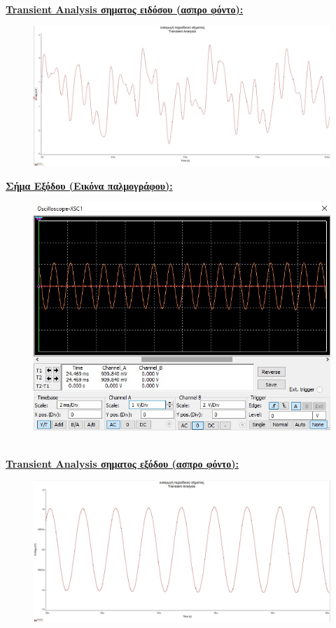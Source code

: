 \documentclass{article}
\begin{document}
{\begin{figure}[h!]
\end{figure} \\
\textbf{\underline{Transient Analysis σηματος ειδόσου (ασπρο φόντο):}}
\begin{figure}[h!]
\centering
 	\advance\leftskip-1cm
  \includegraphics[width=130mm,scale=2]{thema2/multisim7.jpg}
\end{figure} 
\clearpage
\textbf{\underline{Σήμα Εξόδου (Εικόνα παλμογράφου):}}
\begin{figure}[h!]
\centering
 	\advance\leftskip-1cm
  \includegraphics[width=130mm,scale=2]{thema2/multisim8.jpg}
\end{figure} \\
\textbf{\underline{Transient Analysis σηματος εξόδου (ασπρο φόντο):}}
\begin{figure}[h!]
\centering
 	\advance\leftskip-2cm
  \includegraphics[width=130mm,scale=2]{thema2/multisim9.jpg}

\end{figure}}
\end{document}
